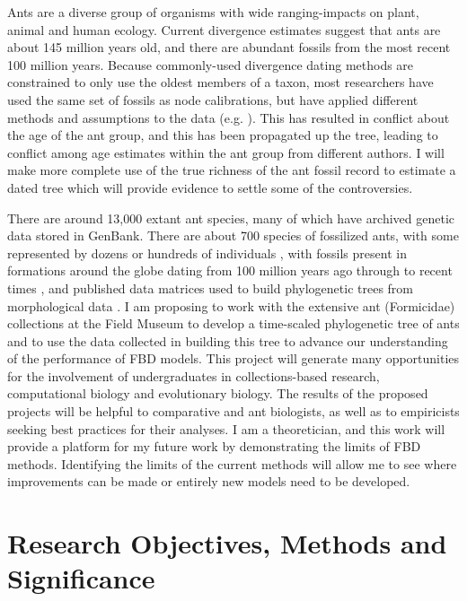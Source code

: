 \documentclass[]{article}
\begin{document}
Ants are a diverse group of organisms with wide ranging-impacts on plant, animal and human ecology. Current divergence estimates suggest that ants are about 145 million years old, and there are abundant fossils from the most recent 100 million years. Because commonly-used divergence dating methods are constrained to only use the oldest members of a taxon, most researchers have used the same set of fossils as node calibrations, but have applied different methods and assumptions to the data (e.g. \citep{brady2006evaluating, moreau2013testing, ward2014}). This has resulted in conflict about the age of the ant group, and this has been propagated up the tree, leading to conflict among age estimates within the ant group from different authors. I will make more complete use of the true richness of the ant fossil record to estimate a dated tree which will provide evidence to settle some of the controversies. \par
There are around 13,000 extant ant species, many of which have archived genetic data stored in GenBank. There are about 700 species of fossilized ants, with some represented by dozens or hundreds of individuals \citep{ref87}, with fossils present in formations around the globe dating from 100 million years ago through to recent times \citep{ref87}, and published data matrices used to build phylogenetic trees from morphological data \citep{urbani1992internal, grimaldi1997new, brady2005morphological}. I am proposing to work with the extensive ant (Formicidae) collections at the Field Museum to develop a time-scaled phylogenetic tree of ants and to use the data collected in building this tree to advance our understanding of the performance of FBD models. This project will generate many opportunities for the involvement of undergraduates in collections-based research, computational biology and evolutionary biology. The results of the proposed projects will be helpful to comparative and ant biologists, as well as to empiricists seeking best practices for their analyses. I am a theoretician, and this work will provide a platform for my future work by demonstrating the limits of FBD methods. Identifying the limits of the current methods will allow me to see where improvements can be made or entirely new models need to be developed. \par


\section*{Research Objectives, Methods and Significance}
\end{document}
